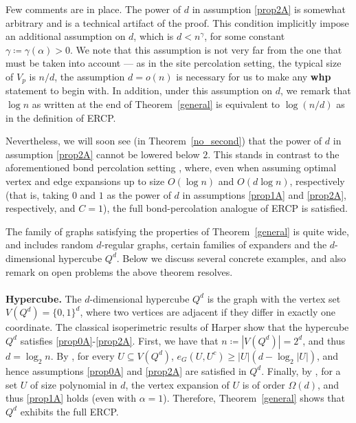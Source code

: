 \documentclass[notitlepage]{scrartcl}
\begin{document}
Few comments are in place. The power of $d$ in assumption \ref{prop2A} is somewhat arbitrary and is a technical artifact of the proof. This condition implicitly impose an additional assumption on $d$, which is $d<n^{\gamma}$, for some constant $\gamma\coloneqq \gamma(\alpha)>0$. We note that this assumption is not very far from the one that must be taken into account --- as in the site percolation setting, the typical size of $V_p$ is $n/d$, the assumption $d=o(n)$ is necessary for us to make any \textbf{whp} statement to begin with. In addition, under this assumption on $d$, we remark that $\log n$ as written at the end of Theorem~\ref{general} is equivalent to $\log (n/d)$ as in the definition of ERCP.

Nevertheless, we will soon see (in Theorem~\ref{no_second}) that the power of $d$ in assumption \ref{prop2A} cannot be lowered below $2$. This stands in contrast to the aforementioned bond percolation setting \cite{diskin2025componentslargesmalli}, where, even when assuming optimal vertex and edge expansions up to size $O(\log n)$ and $O(d\log n)$, respectively (that is, taking $0$ and $1$ as the power of $d$ in assumptions \ref{prop1A} and \ref{prop2A}, respectively, and $C=1$), the full bond-percolation analogue of ERCP is satisfied.

The family of graphs satisfying the properties of Theorem~\ref{general} is quite wide, and includes random $d$-regular graphs, certain families of expanders and the $d$-dimensional hypercube $Q^{d}$. Below we discuss several concrete examples, and also remark on open problems the above theorem resolves.

\paragraph{}
\textbf{Hypercube.} The $d$-dimensional hypercube $Q^d$ is the graph with the vertex set $V(Q^d)=\{0,1\}^d$, where two vertices are adjacent if they differ in exactly one coordinate. The classical isoperimetric results of Harper \cite{zbMATH03353132,zbMATH03254683} show that the hypercube $Q^d$ satisfies \ref{prop0A}-\ref{prop2A}. First, we have that $n\coloneqq \left|V\left(Q^d\right)\right|=2^d$, and thus $d=\log_2 n$. By \cite{zbMATH03353132}, for every $U\subseteq V\left(Q^d\right)$, $e_G(U,U^c)\ge |U|(d-\log_2 |U|)$, and hence assumptions \ref{prop0A} and \ref{prop2A} are satisfied in $Q^d$. Finally, by \cite{zbMATH03254683}, for a set $U$ of size polynomial in $d$, the vertex expansion of $U$ is of order $\Omega(d)$, and thus \ref{prop1A} holds (even with $\alpha=1$). Therefore, Theorem~\ref{general} shows that $Q^d$ exhibits the full ERCP.
\end{document}
